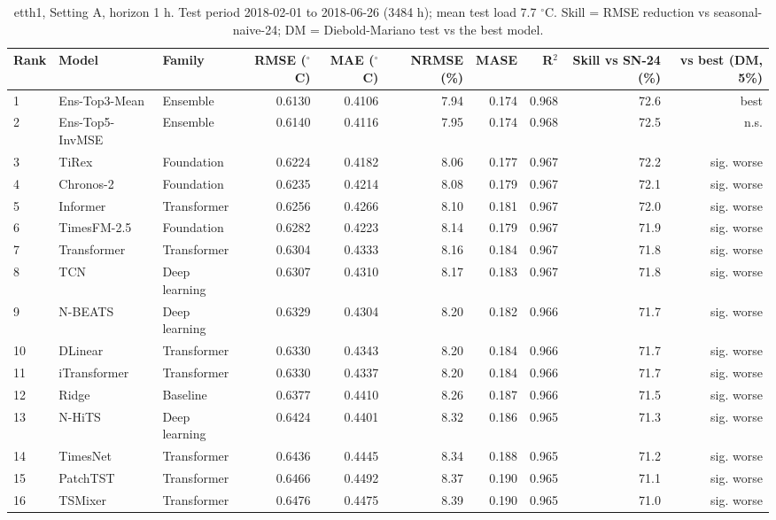 \begin{table}[ht]
\centering
\small
\caption{etth1, Setting A, horizon 1 h. Test period 2018-02-01 to 2018-06-26 (3484 h); mean test load 7.7 $^\circ$C. Skill = RMSE reduction vs seasonal-naive-24; DM = Diebold-Mariano test vs the best model.}
\label{tab:etth1_A_H1_full}
\begin{tabular}{lllrrrrrrr}
\toprule
Rank & Model & Family & RMSE ($^\circ$C) & MAE ($^\circ$C) & NRMSE (\%) & MASE & R$^2$ & Skill vs SN-24 (\%) & vs best (DM, 5\%) \\
\midrule
1 & Ens-Top3-Mean & Ensemble & 0.6130 & 0.4106 & 7.94 & 0.174 & 0.968 & 72.6 & best \\
2 & Ens-Top5-InvMSE & Ensemble & 0.6140 & 0.4116 & 7.95 & 0.174 & 0.968 & 72.5 & n.s. \\
3 & TiRex & Foundation & 0.6224 & 0.4182 & 8.06 & 0.177 & 0.967 & 72.2 & sig. worse \\
4 & Chronos-2 & Foundation & 0.6235 & 0.4214 & 8.08 & 0.179 & 0.967 & 72.1 & sig. worse \\
5 & Informer & Transformer & 0.6256 & 0.4266 & 8.10 & 0.181 & 0.967 & 72.0 & sig. worse \\
6 & TimesFM-2.5 & Foundation & 0.6282 & 0.4223 & 8.14 & 0.179 & 0.967 & 71.9 & sig. worse \\
7 & Transformer & Transformer & 0.6304 & 0.4333 & 8.16 & 0.184 & 0.967 & 71.8 & sig. worse \\
8 & TCN & Deep learning & 0.6307 & 0.4310 & 8.17 & 0.183 & 0.967 & 71.8 & sig. worse \\
9 & N-BEATS & Deep learning & 0.6329 & 0.4304 & 8.20 & 0.182 & 0.966 & 71.7 & sig. worse \\
10 & DLinear & Transformer & 0.6330 & 0.4343 & 8.20 & 0.184 & 0.966 & 71.7 & sig. worse \\
11 & iTransformer & Transformer & 0.6330 & 0.4337 & 8.20 & 0.184 & 0.966 & 71.7 & sig. worse \\
12 & Ridge & Baseline & 0.6377 & 0.4410 & 8.26 & 0.187 & 0.966 & 71.5 & sig. worse \\
13 & N-HiTS & Deep learning & 0.6424 & 0.4401 & 8.32 & 0.186 & 0.965 & 71.3 & sig. worse \\
14 & TimesNet & Transformer & 0.6436 & 0.4445 & 8.34 & 0.188 & 0.965 & 71.2 & sig. worse \\
15 & PatchTST & Transformer & 0.6466 & 0.4492 & 8.37 & 0.190 & 0.965 & 71.1 & sig. worse \\
16 & TSMixer & Transformer & 0.6476 & 0.4475 & 8.39 & 0.190 & 0.965 & 71.0 & sig. worse \\

\end{tabular}
\end{table}
